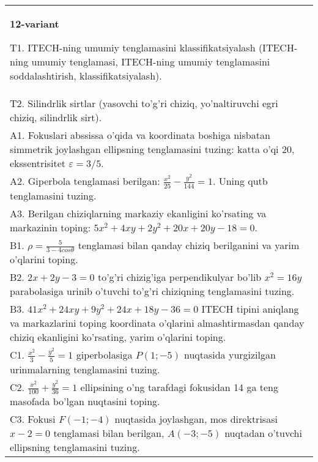 \documentclass{article}
\begin{document}
\begin{tabular}{m{17cm}}
\textbf{12-variant}
\newline

T1. ITECH-ning umumiy tenglamasini klassifikatsiyalash (ITECH-ning umumiy tenglamasi, ITECH-ning umumiy tenglamasini soddalashtirish, klassifikatsiyalash).\\

T2. Silindrlik sirtlar (yasovchi to'g'ri chiziq, yo'naltiruvchi egri chiziq, silindrlik sirt).\\

A1. Fokuslari abssissa o'qida va koordinata boshiga nisbatan simmetrik joylashgan ellipsning tenglamasini tuzing: katta o'qi $20$, ekssentrisitet $\varepsilon=3/5$.\\

A2. Giperbola tenglamasi berilgan: $\frac{x^{2}}{25}-\frac{y^{2}}{144}=1$. Uning qutb tenglamasini tuzing.\\

A3. Berilgan chiziqlarning markaziy ekanligini ko'rsating va markazinin toping: $5x^{2}+4xy+2y^{2}+20x+20y-18=0$.\\

B1. $\rho = \frac{5}{3 - 4cos\theta}$ tenglamasi bilan qanday chiziq berilganini va yarim o'qlarini toping.  \\

B2. $2x + 2y - 3 = 0$ to'g'ri chizig'iga perpendikulyar bo'lib $x^{2} = 16y$ parabolasiga urinib o'tuvchi to'g'ri chiziqning tenglamasini tuzing.  \\

B3. $41x^{2} + 24xy + 9y^{2} + 24x + 18y - 36 = 0$ ITECH tipini aniqlang va markazlarini toping koordinata o'qlarini almashtirmasdan qanday chiziq ekanligini ko'rsating, yarim o'qlarini toping.  \\

C1. $\frac{x^{2}}{3} - \frac{y^{2}}{5} = 1$ giperbolasiga $P(1; - 5)$ nuqtasida yurgizilgan urinmalarning tenglamasini tuzing.\\

C2. $\frac{x^{2}}{100} + \frac{y^{2}}{36} = 1$ ellipsining o'ng tarafdagi fokusidan 14 ga teng masofada bo'lgan nuqtasini toping.  \\

C3. Fokusi $F( - 1; - 4)$ nuqtasida joylashgan, mos direktrisasi $x - 2 = 0$ tenglamasi bilan berilgan, $A( - 3; - 5)$ nuqtadan o'tuvchi ellipsning tenglamasini tuzing.  \\

\end{tabular}
\vspace{1cm}
\end{document}
